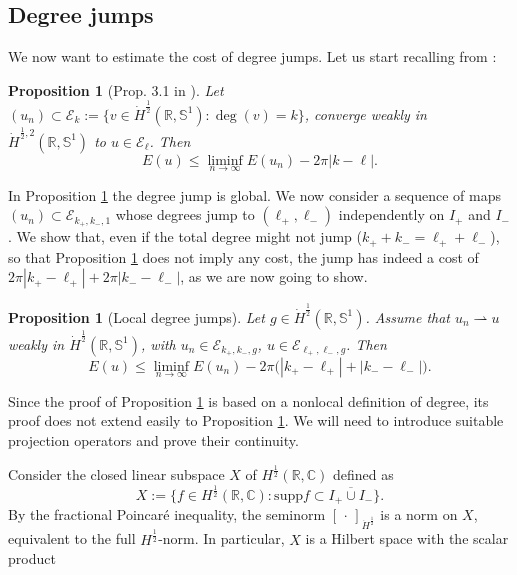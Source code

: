 \documentclass[12pt, a4paper]{article}
\newtheorem{prop}[thm]{Proposition}
\newcommand{\supp}{\mathrm{supp}}
\newcommand{\sph}{\mathbb{S}}
\newcommand{\R}{\mathbb{R}}
\newcommand{\blu}[1]{{\color{blue}#1}}
\renewcommand{\(}{\left(}
\renewcommand{\)}{\right)}
\begin{document}


\subsection{Degree jumps}


We now want to estimate the cost of degree jumps. Let us start recalling from \cite{HM}:
\begin{prop}[Prop. 3.1 in \cite{HM}]\label{p:jump} Let $(u_n)\subset \mathcal{E}_k:=\{v\in \dot H^{\frac12}(\R,\sph^1):\deg(v)=k\}$, converge weakly in $\dot H^{\frac{1}{2},2}(\R,\sph^1)$ to $u\in \mathcal{E}_{\ell}$. Then $$E(u)\le \liminf_{n\to\infty} E(u_n)-2\pi |k-\ell|.$$
\end{prop}
In Proposition \ref{p:jump} the degree jump is global. We now consider a sequence of maps  $(u_n)\subset \mathcal{E}_{k_+,k_-,1}$ whose degrees jump to $(\ell_+,\ell_-)$ independently on $I_+$ and $I_-$. We show that, even if the total degree might not jump ($k_+ + k_- = \ell_+ +\ell_-$), so that Proposition \ref{p:jump} does not imply any cost, the jump has indeed a cost of $2\pi |k_+-\ell_+|+2\pi |k_--\ell_-|$, as we are now going to show. 





\begin{prop}[Local degree jumps]\label{ldegjump}
Let $g\in \dot H^{\frac12}(\mathbb R,\sph^1)$. Assume that
$ u_n \rightharpoonup u$
weakly in  $\dot H^{\frac12}(\mathbb R,\sph^1)$,
with $u_n\in \mathcal E_{k_+,k_-,g}$,
   $u\in \mathcal E_{\ell_+,\ell_-,g}$.
Then
\[
        E(u)
        \le
        \liminf_{n\to\infty} E(u_n)
        -
        2\pi\bigl(|k_+-\ell_+|+|k_- - \ell_-|\bigr).
\]
\end{prop}

Since the proof of Proposition \ref{p:jump} is based on a nonlocal definition of degree, its proof does not extend easily to Proposition \ref{ldegjump}. We will need to introduce suitable projection operators and prove their continuity.

\medskip

Consider the closed linear subspace $X$ of $H^{\frac12}(\mathbb R,\mathbb{C})$ defined as
\begin{equation}\label{defX}
X:=\bigl\{f\in H^{\frac12}(\mathbb R,\mathbb{C}): \supp f \subset {\overline{I_+\cup I_-}}\bigr\}.
\end{equation}
By the fractional Poincar\'e inequality, the seminorm $[\,\cdot\,]_{\dot H^{\frac12}}$
is a norm on $X$, equivalent to the full $H^{\frac12}$-norm. In particular,
$X$ is a Hilbert space with the scalar product
\end{document}
